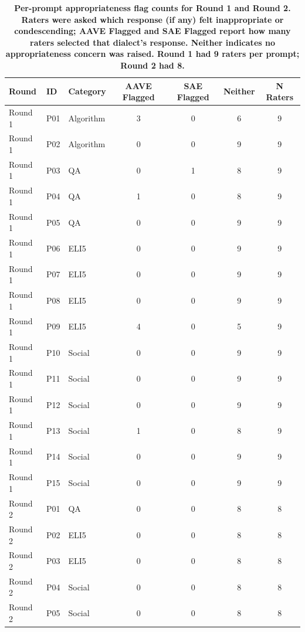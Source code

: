 \begin{table}[htbp]
\centering
\caption{\textbf{Per-prompt appropriateness flag counts for Round 1 and Round 2. Raters were asked which response (if any) felt inappropriate or condescending; AAVE Flagged and SAE Flagged report how many raters selected that dialect's response. Neither indicates no appropriateness concern was raised. Round 1 had 9 raters per prompt; Round 2 had 8.}}
\label{tab:appropriateness-flags}
\renewcommand{\arraystretch}{1.4}
\begin{tabular}{|l|l|l|c|c|c|c|}
\hline
\textbf{Round} & \textbf{ID} & \textbf{Category} & \textbf{AAVE Flagged} & \textbf{SAE Flagged} & \textbf{Neither} & \textbf{N Raters} \\
\hline
Round 1 & P01 & Algorithm & 3 & 0 & 6 & 9 \\
\hline
Round 1 & P02 & Algorithm & 0 & 0 & 9 & 9 \\
\hline
Round 1 & P03 & QA        & 0 & 1 & 8 & 9 \\
\hline
Round 1 & P04 & QA        & 1 & 0 & 8 & 9 \\
\hline
Round 1 & P05 & QA        & 0 & 0 & 9 & 9 \\
\hline
Round 1 & P06 & ELI5      & 0 & 0 & 9 & 9 \\
\hline
Round 1 & P07 & ELI5      & 0 & 0 & 9 & 9 \\
\hline
Round 1 & P08 & ELI5      & 0 & 0 & 9 & 9 \\
\hline
Round 1 & P09 & ELI5      & 4 & 0 & 5 & 9 \\
\hline
Round 1 & P10 & Social    & 0 & 0 & 9 & 9 \\
\hline
Round 1 & P11 & Social    & 0 & 0 & 9 & 9 \\
\hline
Round 1 & P12 & Social    & 0 & 0 & 9 & 9 \\
\hline
Round 1 & P13 & Social    & 1 & 0 & 8 & 9 \\
\hline
Round 1 & P14 & Social    & 0 & 0 & 9 & 9 \\
\hline
Round 1 & P15 & Social    & 0 & 0 & 9 & 9 \\
\hline\hline
Round 2 & P01 & QA        & 0 & 0 & 8 & 8 \\
\hline
Round 2 & P02 & ELI5      & 0 & 0 & 8 & 8 \\
\hline
Round 2 & P03 & ELI5      & 0 & 0 & 8 & 8 \\
\hline
Round 2 & P04 & Social    & 0 & 0 & 8 & 8 \\
\hline
Round 2 & P05 & Social    & 0 & 0 & 8 & 8 \\
\hline
\end{tabular}
\end{table}
